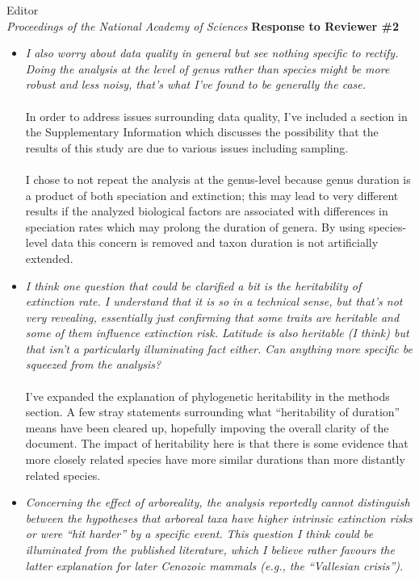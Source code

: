 \documentclass{letter}
\begin{document}
\begin{letter}{Editor \\ \textit{Proceedings of the National Academy of Sciences}}
  \textbf{Response to Reviewer \#2}
  \begin{itemize}
    \item \textit{I also worry about data quality in general but see nothing specific to rectify. Doing the analysis at the level of genus rather than species might be more robust and less noisy, that's what I've found to be generally the case. }
      \\\\In order to address issues surrounding data quality, I've included a section in the Supplementary Information which discusses the possibility that the results of this study are due to various issues including sampling. 
      \\\\I chose to not repeat the analysis at the genus-level because genus duration is a product of both speciation and extinction; this may lead to very different results if the analyzed biological factors are associated with differences in speciation rates which may prolong the duration of genera. By using species-level data this concern is removed and taxon duration is not artificially extended. %
    \item \textit{I think one question that could be clarified a bit is the heritability of extinction rate. I understand that it is so in a technical sense, but that's not very revealing, essentially just confirming that some traits are heritable and some of them influence extinction risk. Latitude is also heritable (I think) but that isn't a particularly illuminating fact either. Can anything more specific be squeezed from the analysis?}
      \\\\I've expanded the explanation of phylogenetic heritability in the methods section. A few stray statements surrounding what ``heritability of duration'' means have been cleared up, hopefully impoving the overall clarity of the document. The impact of heritability here is that there is some evidence that more closely related species have more similar durations than more distantly related species.
    \item \textit{Concerning the effect of arboreality, the analysis reportedly cannot distinguish between the hypotheses that arboreal taxa have higher intrinsic extinction risks or were ``hit harder'' by a specific event. This question I think could be illuminated from the published literature, which I believe rather favours the latter explanation for later Cenozoic mammals (e.g., the ``Vallesian crisis'').}

\end{itemize}
\end{letter}
\end{document}
